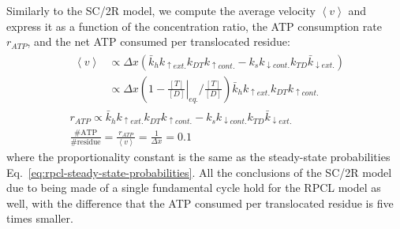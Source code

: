     Similarly to the SC/2R model, we compute the average velocity $\left\langle v \right\rangle$ and express it as a function of the concentration ratio, the ATP consumption rate $r_{ATP}$, and the net ATP consumed per translocated residue:
    \begin{equation}
    \label{eq:rpcl-quantities-of-interest}
    \begin{split}
        &\begin{split}
            \left\langle v \right\rangle 
            &\propto \Delta x \left(\bar{k}_h k_{\uparrow ext.} k_{DT} k_{\uparrow cont.} - k_s k_{\downarrow cont.} k_{TD} \bar{k}_{\downarrow ext.}\right) \\
            &\propto \Delta x \left(1 - \left.\frac{[T]}{[D]}\right|_{eq.}\bigg/\frac{[T]}{[D]}\right) \bar{k}_h k_{\uparrow ext.} k_{DT} k_{\uparrow cont.}
        \end{split} \\
        &r_{ATP} \propto \bar{k}_h k_{\uparrow ext.} k_{DT} k_{\uparrow cont.} - k_s k_{\downarrow cont.} k_{TD} \bar{k}_{\downarrow ext.} \\
        &\frac{\#\text{ATP}}{\#\text{residue}} = \frac{r_{ATP}}{\left\langle v \right\rangle} = \frac{1}{\Delta x} = 0.1
    \end{split}
    \end{equation}
    where the proportionality constant is the same as the steady-state probabilities Eq.~\ref{eq:rpcl-steady-state-probabilities}. All the conclusions of the SC/2R model due to being made of a single fundamental cycle hold for the RPCL model as well, with the difference that the ATP consumed per translocated residue is five times smaller.
    
    